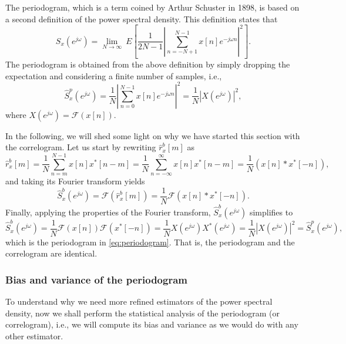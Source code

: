 The periodogram, which is a term coined by Arthur Schuster in 1898, is based on a second definition of the power spectral density. This definition states that
\begin{equation*}
	S_x(e^{j \omega}) = \lim_{N \rightarrow \infty} \ E \left[\frac{1}{2N -1} \left| \sum_{n = -N+1}^{N-1} x[n] e^{-j \omega n} \right|^2 \right].
\end{equation*}
The periodogram is obtained from the above definition by simply dropping the expectation and considering a finite number of samples, i.e.,
\begin{equation}
	\label{eq:periodogram}
	\hat{S}_x^{p}(e^{j \omega}) = \frac{1}{N} \left| \sum_{n = 0}^{N-1} x[n] e^{-j \omega n} \right|^2 = \frac{1}{N} \left| X(e^{j \omega}) \right|^2,
\end{equation}
where $X(e^{j \omega})  = \mathcal{F}(x[n])$.

In the following, we will shed some light on why we have started this section with the correlogram. Let us start by rewriting $\hat{r}_{x}^{b}[m]$ as
\begin{equation*}
\hat{r}_{x}^{b}[m] = \frac{1}{N} \sum_{n = m}^{N-1} x[n] x^{\ast}[n-m] = \frac{1}{N} \sum_{n = -\infty}^{\infty} x[n] x^{\ast}[n-m]  = \frac{1}{N} \left(x[n] \ast x^{\ast}[-n]\right),
\end{equation*}
and taking its Fourier transform yields
\begin{equation*}
\hat{S}_x^{b}(e^{j \omega}) = \mathcal{F}(\hat{r}_{x}^{b}[m]) = \frac{1}{N} \mathcal{F} \left(x[n] \ast x^{\ast}[-n]\right).
\end{equation*}
Finally, applying the properties of the Fourier transform, $\hat{S}_x^{b}(e^{j \omega})$ simplifies to
\begin{equation*}
\hat{S}_x^{b}(e^{j \omega}) = \frac{1}{N} \mathcal{F} \left(x[n] \right) \mathcal{F} \left(x^{\ast}[-n]\right) = \frac{1}{N} X(e^{j \omega}) X^{\ast}(e^{j \omega}) = \frac{1}{N} \left| X(e^{j \omega}) \right|^2 = \hat{S}_x^{p}(e^{j \omega}),
\end{equation*}
which is the periodogram in \eqref{eq:periodogram}. That is, the periodogram and the correlogram are identical.

\subsubsection{Bias and variance of the periodogram}

To understand why we need more refined estimators of the power spectral density, now we shall perform the statistical analysis of the periodogram (or correlogram), i.e.,  we will compute its bias and variance as we would do with any other estimator.

